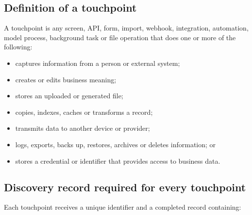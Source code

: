 \documentclass[11pt]{article}
\begin{document}
\subsection{Definition of a touchpoint}

A touchpoint is any screen, API, form, import, webhook, integration, automation, model process, background task or file operation that does one or more of the following:

\begin{itemize}
  \item captures information from a person or external system;
  \item creates or edits business meaning;
  \item stores an uploaded or generated file;
  \item copies, indexes, caches or transforms a record;
  \item transmits data to another device or provider;
  \item logs, exports, backs up, restores, archives or deletes information; or
  \item stores a credential or identifier that provides access to business data.
\end{itemize}

\subsection{Discovery record required for every touchpoint}

Each touchpoint receives a unique identifier and a completed record containing:
\end{document}
